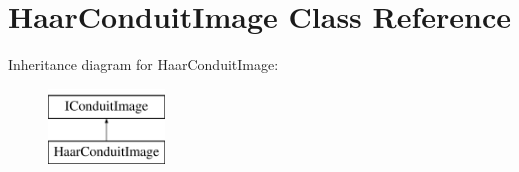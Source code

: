 \hypertarget{classefb_1_1HaarConduitImage}{
\section{HaarConduitImage Class Reference}
\label{classefb_1_1HaarConduitImage}
}
Inheritance diagram for HaarConduitImage:\begin{figure}[H]
\begin{center}
\leavevmode
\includegraphics[height=2.000000cm]{classefb_1_1HaarConduitImage}
\end{center}
\end{figure}
